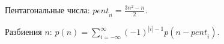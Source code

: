 Пентагональные числа: $\mathit{pent}_{n}={\frac {3n^{2}-n}{2}}$.

Разбиения $n$: $p(n) = \sum \limits_{i=-\infty}^{\infty} (-1)^{|i|-1} p(n-\mathit{pent}_i)$.